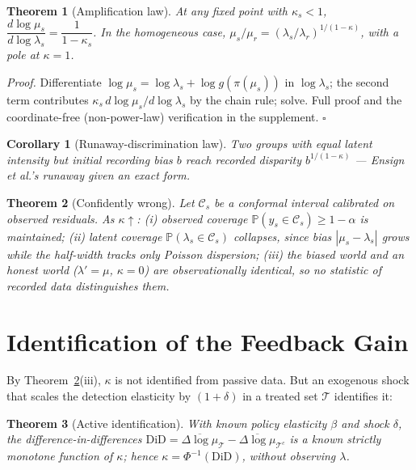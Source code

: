 \documentclass[10pt]{article}
\newtheorem{theorem}{Theorem}
\newtheorem{corollary}{Corollary}
\begin{document}
\begin{theorem}[Amplification law]
\label{thm:law}
At any fixed point with $\kappa_s<1$,
$\dfrac{d\log\mu_s}{d\log\lambda_s}=\dfrac{1}{1-\kappa_s}$. In the homogeneous
case, $\mu_s/\mu_r=(\lambda_s/\lambda_r)^{1/(1-\kappa)}$, with a pole at
$\kappa=1$.
\end{theorem}
\noindent\emph{Proof.} Differentiate $\log\mu_s=\log\lambda_s+\log g(\pi(\mu_s))$
in $\log\lambda_s$; the second term contributes $\kappa_s\,d\log\mu_s/d\log\lambda_s$
by the chain rule; solve. Full proof and the coordinate-free (non-power-law)
verification in the supplement. $\square$

\begin{corollary}[Runaway-discrimination law]
Two groups with equal latent intensity but initial recording bias $b$ reach
recorded disparity $b^{1/(1-\kappa)}$ --- Ensign et al.'s runaway given an exact
form.
\end{corollary}

\begin{theorem}[Confidently wrong]
\label{thm:cw}
Let $\mathcal C_s$ be a conformal interval calibrated on observed residuals.
As $\kappa\uparrow$: (i) observed coverage $\mathbb P(y_s\in\mathcal C_s)\ge
1-\alpha$ is maintained; (ii) latent coverage $\mathbb P(\lambda_s\in\mathcal
C_s)$ collapses, since bias $|\mu_s-\lambda_s|$ grows while the half-width tracks
only Poisson dispersion; (iii) the biased world and an honest world
($\lambda'=\mu$, $\kappa=0$) are observationally identical, so no statistic of
recorded data distinguishes them.
\end{theorem}

\section{Identification of the Feedback Gain}
\label{sec:ident}

By Theorem~\ref{thm:cw}(iii), $\kappa$ is not identified from passive data. But an
exogenous shock that scales the detection elasticity by $(1+\delta)$ in a treated
set $\mathcal T$ identifies it:

\begin{theorem}[Active identification]
With known policy elasticity $\beta$ and shock $\delta$, the difference-in-differences
$\mathrm{DiD}=\overline{\Delta\log\mu}_{\mathcal T}-\overline{\Delta\log\mu}_{\mathcal T^c}$
is a known strictly monotone function of $\kappa$; hence $\kappa=\Phi^{-1}(\mathrm{DiD})$,
without observing $\lambda$.
\end{theorem}
\end{document}
